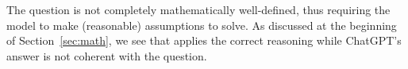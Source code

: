  The question is not completely mathematically well-defined, thus requiring the model to make (reasonable) assumptions to solve. As discussed at the beginning of Section~\ref{sec:math}, we see that {\DV} applies the correct reasoning while ChatGPT's answer is not coherent with the question.
\begin{comment}
one possible method is to use a simple model of exponential growth and assume that the birth and death rates are constant over time. This is not very realistic, but it might give a rough estimate.
One way to write an exponential growth model is: P(t) = P(0) * e^(rt)
where P(t) is the population at time t, P(0) is the initial population, e is the base of the natural logarithm, and r is the growth rate. We can use the given data to find r by plugging in P(0) = 1000, P(100) = 10000, and t = 100: 10000 = 1000 * e^(r*100).
Solving for r, we get: r = ln(10) / 100
r is approximately 0.0231.
Now, to find the number of people with an age between 40 and 50, we need to estimate the proportion of the population that falls in that age group. One way to do this is to assume that the population has a stable age distribution, meaning that the proportion of people in each age group is constant over time. This is also not very realistic, but it might give a rough estimate.
To find the stable age distribution, we need to know the survival function, which is the probability of surviving from birth to a given age. We can use the exponential growth model to find the survival function by assuming that the death rate is equal to the growth rate. This means that the population is in equilibrium, and that the number of births and deaths are equal. This is also not very realistic, but it might give a rough estimate.
The survival function is:
S(x) = e^(-rx)
where x is the age in years. This means that the probability of surviving from birth to age x is equal to e^(-rx).
To find the proportion of people in the age group 40 to 50, we need to find the probability of surviving from birth to age 40, and subtract the probability of surviving from birth to age 50. This is:
P(40 < x < 50) = S(40) - S(50). P(40 < x < 50) = e^(-r*40) - e^(-r*50)
Plugging in r = 0.0231, we get: P(40 < x < 50) = e^(-0.9239) - e^(-1.1549), P(40 < x < 50) = 0.3967 - 0.3156, P(40 < x < 50) = 0.0811
This means that about 8.11%
N(40 < x < 50) = P(40 < x < 50) * P(100). N(40 < x < 50) = 0.0811 * 10000. N(40 < x < 50) = 811
Therefore, there are about 811 people with an age between 40 and 50 in the town.
\end{comment}
